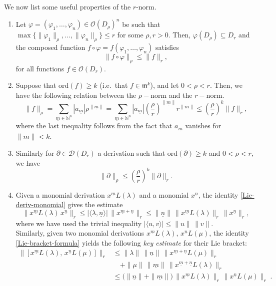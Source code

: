 \documentclass[10pt,twoside,reqno]{amsart}
\theoremstyle{remark}
\theoremstyle{remark}
\newcommand{\N}{\mathbb{N}}
\newcommand{\um}{{\underline m}}
\newcommand{\un}{{\underline n}}
\newcommand{\ord}{\mathrm{ord}}
\newcommand{\oO}{\mathcal{O}}
\newcommand{\cD}{\mathcal{D}}
\begin{document}
    We now list some useful properties of the $r$-norm.
	\begin{enumerate}
		\item Let  $\varphi=(\varphi_1, \ldots, \varphi_n ) \in \oO(D_\rho)^n$ be such that $\max \{\|\varphi_1\|_\rho, \ldots, \|\varphi_n\|_\rho\}\le r$ for some $\rho,r>0$. Then, $\varphi(D_\rho) \subseteq D_r$ and the composed function $f \circ \varphi=f(\varphi_1,\ldots, \varphi_n)$ satisfies
	$$
	\| f \circ \varphi \|_\rho \le \| f \|_r,
	$$
	for all functions $f \in \oO(D_r)$. 
		\item Suppose that $\ord(f) \ge k$ (i.e.~that $f\in \mathfrak{m}^{k}$), and let $0<\rho<r$. Then, we have the following relation between the $\rho-$norm and the $r-$norm.
		$$  \| f\| _\rho = \sum_{\um \in \N^n} |a_{\um}| \rho^{\| \um\| } = \sum_{\um \in \N^n} |a_{\um}| \left(\frac{\rho}{r}\right)^{\| \um\| }  r^{ \|m\| } \leq \left(\frac{\rho}{r}\right)^{  k } \| f\|_ r, $$
        where the last inequality follows from the fact that $a_{\um}$ vanishes for $\|\um\| < k$.
		\item Similarly for $\partial \in \cD(D_r)$ a derivation such that $\ord(\partial)\ge k$ and $0<\rho<r$, we have
		$$ \|\partial\|_\rho\leq \left(\frac{\rho}{r}\right)^{  k } \| \partial \|_ r . $$
		\item  Given a monomial derivation $x^{\um} L(\lambda)$ and a monomial $x^{\un}$, the identity \eqref{Lie-deriv-monomial} gives the estimate
		\begin{equation}
		\| x^\um L(\lambda)\, x^\un \|_r \leq |\langle \lambda,\un\rangle |\,  \|x^{\um+\un}\|_r \leq \|\un\|\,  \|x^\um L(\lambda)\|_r\, \|x^\un\|_r,
		\end{equation}
		 where we have used the trivial inequality $|\langle u,v \rangle | \leq \|u\|\, \|v\|$.\\
		 Similarly, given two monomial derivations $x^{\um} L(\lambda),\, x^{\un} L(\mu)$, the identity \eqref{Lie-bracket-formula} yields the following {\em key estimate} for their Lie bracket:
	\begin{equation*}
\begin{split}
\bigl\|\, \big[\, x^{\um} L(\lambda),\, x^{\un} L(\mu) \,\big]\, \bigr\|_r
&\le
\|\lambda\|\, \|\un\|\, \bigl\| x^{\um+\un} L(\mu) \bigr\|_r \\
&\quad
+ \|\mu\|\, \|\um\|\, \bigl\| x^{\um+\un} L(\lambda) \bigr\|_r \\
&\le
\bigl(\|\un\| + \|\um\|\bigr)\,
\bigl\| x^{\um} L(\lambda) \bigr\|_r\,
\bigl\| x^{\un} L(\mu) \bigr\|_r \; .
\end{split}

\end{equation*}
\end{enumerate}
\end{document}
